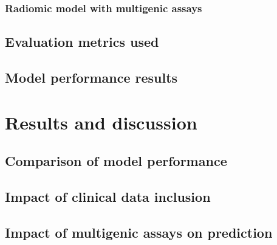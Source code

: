\documentclass[conference]{IEEEtran}
\begin{document}
\subsubsection{Radiomic model with multigenic assays}

\subsection{Evaluation metrics used}


\subsection{Model performance results}




\section{Results and discussion}

\subsection{Comparison of model performance}

\subsection{Impact of clinical data inclusion}

\subsection{Impact of multigenic assays on prediction}


 
\end{document}
